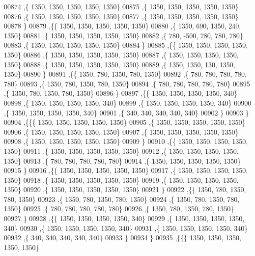 \begin{DoxyCode}
00874    ,\{  1350,  1350,  1350,  1350,  1350\}
00875    ,\{  1350,  1350,  1350,  1350,  1350\}
00876    ,\{  1350,  1350,  1350,  1350,  1350\}
00877    ,\{  1350,  1350,  1350,  1350,  1350\}
00878    \}
00879   ,\{\{  1350,  1350,  1350,  1350,  1350\}
00880    ,\{  1350,   690,  1350,   240,  1350\}
00881    ,\{  1350,  1350,  1350,  1350,  1350\}
00882    ,\{   780,  -500,   780,   780,   780\}
00883    ,\{  1350,  1350,  1350,  1350,  1350\}
00884    \}
00885   ,\{\{  1350,  1350,  1350,  1350,  1350\}
00886    ,\{  1350,  1350,  1350,  1350,  1350\}
00887    ,\{  1350,  1350,  1350,  1350,  1350\}
00888    ,\{  1350,  1350,  1350,  1350,  1350\}
00889    ,\{  1350,  1350,   130,  1350,  1350\}
00890    \}
00891   ,\{\{  1350,   780,  1350,   780,  1350\}
00892    ,\{   780,   780,   780,   780,   780\}
00893    ,\{  1350,   780,  1350,   780,  1350\}
00894    ,\{   780,   780,   780,   780,   780\}
00895    ,\{  1350,   780,  1350,   780,  1350\}
00896    \}
00897   ,\{\{  1350,  1350,  1350,  1350,   340\}
00898    ,\{  1350,  1350,  1350,  1350,   340\}
00899    ,\{  1350,  1350,  1350,  1350,   340\}
00900    ,\{  1350,  1350,  1350,  1350,   340\}
00901    ,\{   340,   340,   340,   340,   340\}
00902    \}
00903   \}
00904  ,\{\{\{  1350,  1350,  1350,  1350,  1350\}
00905    ,\{  1350,  1350,  1350,  1350,  1350\}
00906    ,\{  1350,  1350,  1350,  1350,  1350\}
00907    ,\{  1350,  1350,  1350,  1350,  1350\}
00908    ,\{  1350,  1350,  1350,  1350,  1350\}
00909    \}
00910   ,\{\{  1350,  1350,  1350,  1350,  1350\}
00911    ,\{  1350,  1350,  1350,  1350,  1350\}
00912    ,\{  1350,  1350,  1350,  1350,  1350\}
00913    ,\{   780,   780,   780,   780,   780\}
00914    ,\{  1350,  1350,  1350,  1350,  1350\}
00915    \}
00916   ,\{\{  1350,  1350,  1350,  1350,  1350\}
00917    ,\{  1350,  1350,  1350,  1350,  1350\}
00918    ,\{  1350,  1350,  1350,  1350,  1350\}
00919    ,\{  1350,  1350,  1350,  1350,  1350\}
00920    ,\{  1350,  1350,  1350,  1350,  1350\}
00921    \}
00922   ,\{\{  1350,   780,  1350,   780,  1350\}
00923    ,\{  1350,   780,  1350,   780,  1350\}
00924    ,\{  1350,   780,  1350,   780,  1350\}
00925    ,\{   780,   780,   780,   780,   780\}
00926    ,\{  1350,   780,  1350,   780,  1350\}
00927    \}
00928   ,\{\{  1350,  1350,  1350,  1350,   340\}
00929    ,\{  1350,  1350,  1350,  1350,   340\}
00930    ,\{  1350,  1350,  1350,  1350,   340\}
00931    ,\{  1350,  1350,  1350,  1350,   340\}
00932    ,\{   340,   340,   340,   340,   340\}
00933    \}
00934   \}
00935  ,\{\{\{  1350,  1350,  1350,  1350,  1350\}

\end{DoxyCode}
